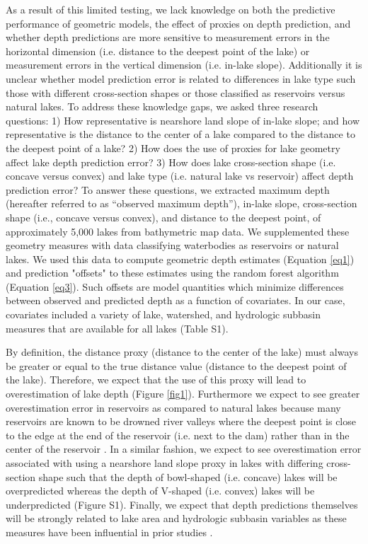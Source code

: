 \documentclass[draft]{agujournal2019}
\begin{document}
As a result of this limited testing, we lack knowledge on both the predictive performance of geometric models, the effect of proxies on depth prediction, and whether depth predictions are more sensitive to measurement errors in the horizontal dimension (i.e. distance to the deepest point of the lake) or measurement errors in the vertical dimension (i.e. in-lake slope). Additionally it is unclear whether model prediction error is related to differences in lake type such those with different cross-section shapes or those classified as reservoirs versus natural lakes. To address these knowledge gaps, we asked three research questions: 1) How representative is nearshore land slope of in-lake slope; and how representative is the distance to the center of a lake compared to the distance to the deepest point of a lake? 2) How does the use of proxies for lake geometry affect lake depth prediction error? 3) How does lake cross-section shape (i.e. concave versus convex) and lake type (i.e. natural lake vs reservoir) affect depth prediction error? To answer these questions, we extracted maximum depth (hereafter referred to as “observed maximum depth”), in-lake slope, cross-section shape (i.e., concave versus convex), and distance to the deepest point, of approximately 5,000 lakes from bathymetric map data. We supplemented these geometry measures with data classifying waterbodies as reservoirs or natural lakes. We used this data to compute geometric depth estimates (Equation \ref{eq1}) and prediction "offsets" to these estimates using the random forest algorithm (Equation \ref{eq3}). Such offsets are model quantities which minimize differences between observed and predicted depth as a function of covariates. In our case, covariates included a variety of lake, watershed, and hydrologic subbasin measures that are available for all lakes (Table S1).

By definition, the distance proxy (distance to the center of the lake) must always be greater or equal to the true distance value (distance to the deepest point of the lake). Therefore, we expect that the use of this proxy will lead to overestimation of lake depth (Figure \ref{fig1}). Furthermore we expect to see greater overestimation error in reservoirs as compared to natural lakes because many reservoirs are known to be drowned river valleys where the deepest point is close to the edge at the end of the reservoir (i.e. next to the dam) rather than in the center of the reservoir \cite{lanza1985interactions}. In a similar fashion, we expect to see overestimation error associated with using a nearshore land slope proxy in lakes with differing cross-section shape such that the depth of bowl-shaped (i.e. concave) lakes will be overpredicted whereas the depth of V-shaped (i.e. convex) lakes will be underpredicted (Figure S1). Finally, we expect that depth predictions themselves will be strongly related to lake area and hydrologic subbasin variables as these measures have been influential in prior studies \cite{oliver2016prediction}.
\end{document}
